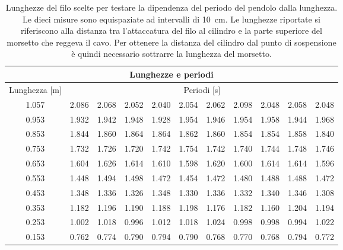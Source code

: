 \begin{table}
    \centering
    \begin{tabular}{c c c c c c c c c c c}
        \multicolumn{11}{c}{\textbf{Lunghezze e periodi}} \\
        \toprule
        Lunghezza [m] & \multicolumn{10}{c}{Periodi [s]} \\
        \midrule
        1.057 & 2.086 & 2.068 & 2.052 & 2.040 & 2.054 & 2.062 & 2.098 & 2.048 & 2.058 & 2.048 \\
        0.953 & 1.932 & 1.942 & 1.948 & 1.928 & 1.954 & 1.946 & 1.954 & 1.958 & 1.944 & 1.968 \\
        0.853 & 1.844 & 1.860 & 1.864 & 1.864 & 1.862 & 1.860 & 1.854 & 1.854 & 1.858 & 1.840 \\
        0.753 & 1.732 & 1.726 & 1.720 & 1.742 & 1.754 & 1.742 & 1.740 & 1.744 & 1.748 & 1.746 \\
        0.653 & 1.604 & 1.626 & 1.614 & 1.610 & 1.598 & 1.620 & 1.600 & 1.614 & 1.614 & 1.596 \\
        0.553 & 1.448 & 1.494 & 1.498 & 1.472 & 1.454 & 1.472 & 1.480 & 1.488 & 1.488 & 1.472 \\
        0.453 & 1.348 & 1.336 & 1.326 & 1.348 & 1.330 & 1.336 & 1.332 & 1.340 & 1.346 & 1.308 \\
        0.353 & 1.182 & 1.196 & 1.190 & 1.188 & 1.198 & 1.176 & 1.182 & 1.160 & 1.204 & 1.194 \\
        0.253 & 1.002 & 1.018 & 0.996 & 1.012 & 1.018 & 1.024 & 0.998 & 0.998 & 0.994 & 1.022 \\
        0.153 & 0.762 & 0.774 & 0.790 & 0.794 & 0.790 & 0.768 & 0.770 & 0.768 & 0.794 & 0.772 \\
        \bottomrule
    \end{tabular}
    \caption{Lunghezze del filo scelte per testare la dipendenza del periodo
        del pendolo dalla lunghezza. Le dieci misure sono equispaziate ad intervalli di \SI{10}{\centi\metre}.
        Le lunghezze riportate si riferiscono alla distanza tra l'attaccatura del filo al cilindro e la parte superiore
        del morsetto che reggeva il cavo. Per ottenere la distanza del cilindro dal punto di sospensione è quindi
        necessario sottrarre la lunghezza del morsetto.}
    \label{tab:lunghezze_periodi}
\end{table}
